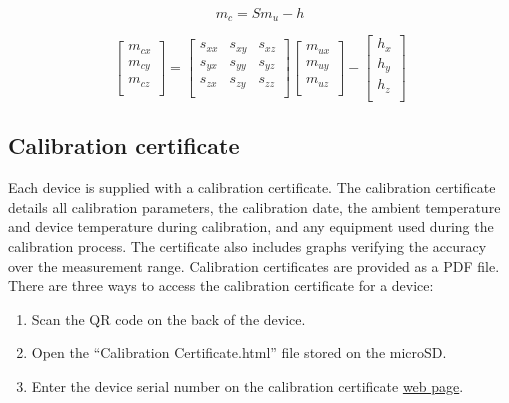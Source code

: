 \begin{equation}
\label{eq:magnetometer}
m_c = S m_u - h
\end{equation}

\begin{equation}
\label{eq:magnetometerExpanded}
    \begin{bmatrix}
        m_{cx}\\
        m_{cy}\\
        m_{cz}\\
    \end{bmatrix}
    =
    \begin{bmatrix}
        s_{xx} & s_{xy} & s_{xz}\\
        s_{yx} & s_{yy} & s_{yz}\\
        s_{zx} & s_{zy} & s_{zz}\\
    \end{bmatrix}
    \begin{bmatrix}
        m_{ux}\\
        m_{uy}\\
        m_{uz}\\
    \end{bmatrix}
    -
    \begin{bmatrix}
        h_{x}\\
        h_{y}\\
        h_{z}\\
    \end{bmatrix}
\end{equation}

\subsection{Calibration certificate}

Each device is supplied with a calibration certificate.  The calibration certificate details all calibration parameters, the calibration date, the ambient temperature and device temperature during calibration, and any equipment used during the calibration process.  The certificate also includes graphs verifying the accuracy over the measurement range.  Calibration certificates are provided as a \ac{PDF} file.  There are three ways to access the calibration certificate for a device:

\begin{enumerate}[nolistsep]
    \item Scan the \ac{QR} code on the back of the device.
    \item Open the \enquote{Calibration Certificate.html} file stored on the \ac{microSD}.
    \item Enter the device serial number on the calibration certificate \href{https://x-io.co.uk/calibration-certificate/}{web page}.
\end{enumerate}
